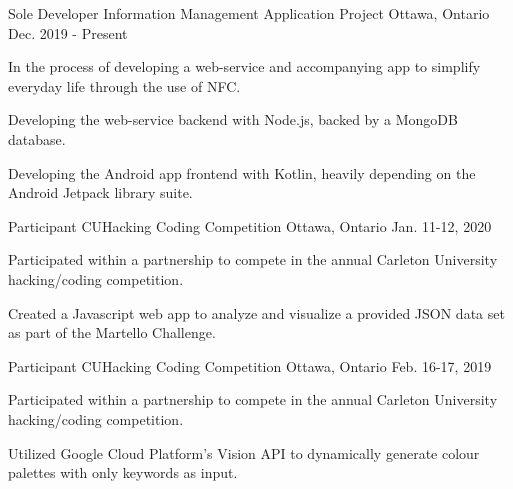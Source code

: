 

\begin{cventries}

  \cventry
    {Sole Developer} %
    {Information Management Application Project} %
    {Ottawa, Ontario} %
    {Dec. 2019 - Present} %
    {
      \begin{cvitems} %
      \item {In the process of developing a web-service and accompanying app to simplify everyday life through the use of NFC.}
      \item {Developing the web-service backend with Node.js, backed by a MongoDB database.}
      \item {Developing the Android app frontend with Kotlin, heavily depending on the Android Jetpack library suite.}
      \end{cvitems}
    }

  \cventry
    {Participant} %
    {CUHacking Coding Competition} %
    {Ottawa, Ontario} %
    {Jan. 11-12, 2020} %
    {
      \begin{cvitems} %
      \item {Participated within a partnership to compete in the annual Carleton University hacking/coding competition.}
      \item {Created a Javascript web app to analyze and visualize a provided JSON data set as part of the Martello Challenge.}
      \end{cvitems}
    }

  \cventry
    {Participant} %
    {CUHacking Coding Competition} %
    {Ottawa, Ontario} %
    {Feb. 16-17, 2019} %
    {
      \begin{cvitems} %
      \item {Participated within a partnership to compete in the annual Carleton University hacking/coding competition.}
      \item {Utilized Google Cloud Platform's Vision API to dynamically generate colour palettes with only keywords as input.}
      \end{cvitems}
    }


\end{cventries}
